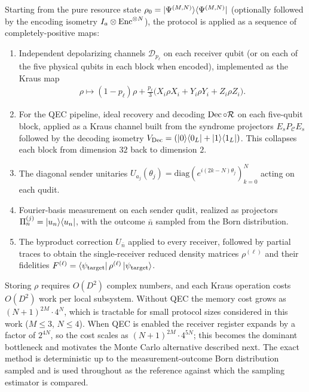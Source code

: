 Starting from the pure resource state $\rho_0 = \ket{\Psi^{(M,N)}}\!\bra{\Psi^{(M,N)}}$ (optionally followed by the encoding isometry $I_a \otimes \operatorname{Enc}^{\otimes N}$), the protocol is applied as a sequence of completely-positive maps:
\begin{enumerate}
    \item Independent depolarizing channels $\mathcal{D}_{p_\ell}$ on each receiver qubit (or on each of the five physical qubits in each block when encoded), implemented as the Kraus map
    \begin{align}
        \rho \mapsto (1-p_\ell)\rho + \tfrac{p_\ell}{3}\big(X_i\rho X_i + Y_i\rho Y_i + Z_i\rho Z_i\big).
    \end{align}
    \item For the QEC pipeline, ideal recovery and decoding $\operatorname{Dec}\circ\mathcal{R}$ on each five-qubit block, applied as a Kraus channel built from the syndrome projectors $E_s P_{\mathcal{C}} E_s$ followed by the decoding isometry $V_{\mathrm{Dec}} = (\ket{0}\!\bra{0_L} + \ket{1}\!\bra{1_L})$. This collapses each block from dimension $32$ back to dimension $2$.
    \item The diagonal sender unitaries $U_{a_j}(\theta_j) = \mathrm{diag}\!\left(e^{i(2k-N)\theta_j}\right)_{k=0}^{N}$ acting on each qudit.
    \item Fourier-basis measurement on each sender qudit, realized as projectors $\Pi_n^{(j)} = \ket{u_n}\!\bra{u_n}$, with the outcome $\bar n$ sampled from the Born distribution.
    \item The byproduct correction $U_{\bar n}$ applied to every receiver, followed by partial traces to obtain the single-receiver reduced density matrices $\rho^{(\ell)}$ and their fidelities $F^{(\ell)} = \bra{\psi_{\mathrm{target}}}\rho^{(\ell)}\ket{\psi_{\mathrm{target}}}$.
\end{enumerate}

Storing $\rho$ requires $O(D^2)$ complex numbers, and each Kraus operation costs $O(D^2)$ work per local subsystem. Without QEC the memory cost grows as $(N+1)^{2M} \cdot 4^{N}$, which is tractable for small protocol sizes considered in this work ($M\le 3$, $N\le 4$). When QEC is enabled the receiver register expands by a factor of $2^{4N}$, so the cost scales as $(N+1)^{2M} \cdot 4^{5N}$; this becomes the dominant bottleneck and motivates the Monte Carlo alternative described next. The exact method is deterministic up to the measurement-outcome Born distribution sampled and is used throughout as the reference against which the sampling estimator is compared.

